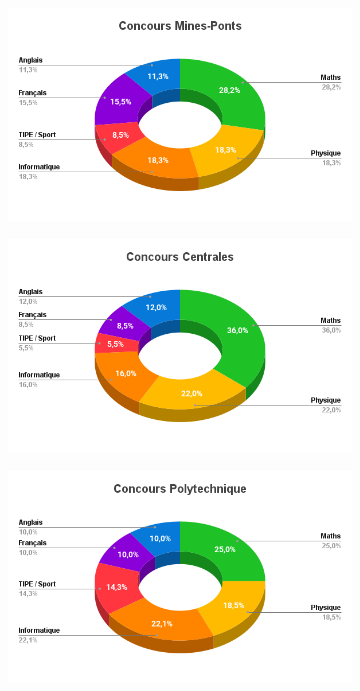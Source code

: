 \documentclass{beamer}
\begin{document}
\begin{frame}
    \begin{figure}[h]
        \begin{subfigure}{0.49\textwidth}
            \includegraphics[width=0.95\linewidth]{ressource_diapo/Mines-Ponts.png}
        \end{subfigure}
        \begin{subfigure}{0.49\textwidth}
            \includegraphics[width=0.95\linewidth]{ressource_diapo/Centrales.png}
        \end{subfigure}
        \begin{subfigure}{0.49\textwidth}
            \includegraphics[width=0.95\linewidth]{ressource_diapo/X.png}

\end{subfigure}
\end{figure}
\end{frame}
\end{document}
